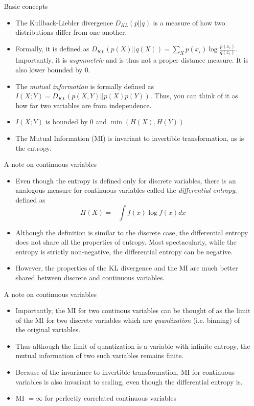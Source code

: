 \documentclass{beamer}
\begin{document}
\begin{frame}{Basic concepts}
\begin{itemize}
	\item The Kullback-Liebler divergence $D_{KL}(p||q)$ is a measure of how two distributions differ from one another.
	\item Formally, it is defined as $D_{KL}(p(X)||q(X)) = \sum_{X} p(x_i) \log \frac{p(x_i)}{q(x_i)}$. Importantly, it is \emph{asymmetric} and is thus not a proper distance measure. It is also lower bounded by 0. 
	\item The \emph{mutual information} is formally defined as $I(X;Y)=D_{KL}(p(X,Y)||p(X)p(Y))$. Thus, you can think of it as how far two variables are from independence. 
	\item $I(X;Y)$ is bounded by 0 and $\min (H(X), H(Y))$
	\item The Mutual Information (MI) is invariant to invertible transformation, as is the entropy. 
\end{itemize}
\end{frame}

\begin{frame}{A note on continuous variables}
	\begin{itemize}
		\item Even though the entropy is defined only for discrete variables, there is an analogous measure for continuous variables called the \emph{differential entropy}, defined as 
		\[
			H(X) = - \int f(x) \log f(x) dx
		\]
		\item Although the definition is similar to the discrete case, the differential entropy does not share all the properties of entropy. Most spectacularly, while the entropy is strictly non-negative, the differential entropy can be negative. 
		\item However, the properties of the KL divergence and the MI are much better shared between discrete and continuous variables. 
	\end{itemize}
\end{frame}

\begin{frame}{A note on continuous variables}
\begin{itemize}
	\item Importantly, the MI for two continous variables can be thought of as the limit of the MI for two discrete variables which are \emph{quantization} (i.e. binning) of the original variables. 
	\item Thus although the limit of quantization is a variable with infinite entropy, the mutual information of two such variables remains finite. 
	\item Because of the invariance to invertible transformation, MI for continuous variables is also invariant to scaling, even though the differential entropy is. 
	\item MI $= \infty$ for perfectly correlated continuous variables
\end{itemize}
\end{frame}
\end{document}
